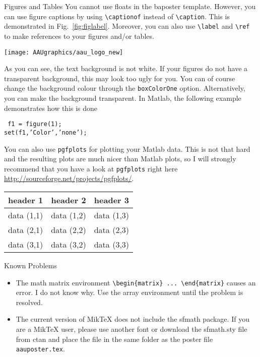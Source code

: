 \documentclass[a0paper,portrait]{baposter}
\begin{document}
\begin{poster}
\begin{posterbox}[name=figures,column=1,below=install,above=bottom]{Figures and Tables}
You cannot use floats in the baposter template. However, you can use figure captions by using {\tt \textbackslash captionof} instead of {\tt \textbackslash caption}. This is demonstrated in Fig.~\ref{fig:figlabel}. Moreover, you can also use {\tt \textbackslash label} and {\tt \textbackslash ref} to make references to your figures and/or tables.
\begin{center}
  \texttt{[image: AAUgraphics/aau\_logo\_new]}
  \label{fig:figlabel}
\end{center}
As you can see, the text background is not white. If your figures do not have a transparent background, this may look too ugly for you. You can of course change the background colour through the {\tt boxColorOne} option. Alternatively, you can make the background transparent. In Matlab, the following example demonstrates how this is done\par
{\tt
f1 = figure(1);\\
set(f1,'Color','none');
}\par
You can also use {\tt pgfplots} \cite{pgfplots} for plotting your Matlab data. This is not that hard and the resulting plots are much nicer than Matlab plots, so I will strongly recommend that you have a look at {\tt pgfplots} right here \url{http://sourceforge.net/projects/pgfplots/}.
\begin{center}
  \begin{tabular}{c c c}
    \toprule
    header 1 & header 2 & header 3\\
    \midrule
    data (1,1) & data (1,2) & data (1,3)\\
    data (2,1) & data (2,2) & data (2,3)\\
    data (3,1) & data (3,2) & data (3,3)\\
    \bottomrule
  \end{tabular}
  \label{tab:tablabel}
\end{center}
\end{posterbox}

\begin{posterbox}[name=problems,column=2,below=install]{Known Problems}
  \begin{itemize}
    \item The math matrix environment {\tt \textbackslash begin\{matrix\} ... \textbackslash end\{matrix\}} causes an error. I do not know why. Use the array environment until the problem is resolved.
    \item The current version of MikTeX does not include the sfmath package. If you are a MikTeX user, please use another font or download the sfmath.sty file from ctan \cite{ctan} and place the file in the same folder as the poster file {\tt aauposter.tex}.
  \end{itemize}
\end{posterbox}


\end{poster}
\end{document}
